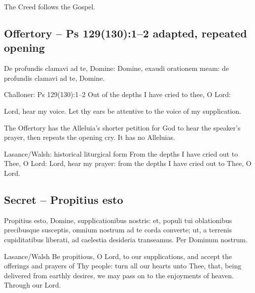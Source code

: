 The Creed follows the Gospel.

\subsection{Offertory -- Ps 129(130):1--2 adapted, repeated opening}
\label{proper-offertory}

\begin{latinproper}
De profundis clamavi ad te, Domine: Domine, exaudi orationem meam:
de profundis clamavi ad te, Domine.
\end{latinproper}

\begin{englishwitness}{Challoner: Ps 129(130):1--2}
Out of the depths I have cried to thee, O Lord:

Lord, hear my voice. Let thy ears be attentive to the voice of my supplication.
\end{englishwitness}

The Offertory has the Alleluia's shorter petition for God to hear the
speaker's prayer, then repeats the opening cry. It has no Alleluias.

\begin{englishwitness}{Lasance/Walsh: historical liturgical form}
From the depths I have cried out to Thee, O Lord: Lord, hear my prayer:
from the depths I have cried out to Thee, O Lord.
\end{englishwitness}

\subsection{Secret -- Propitius esto}
\label{proper-secret}

\begin{latinproper}
Propitius esto, Domine, supplicationibus nostris: et, populi tui
oblationibus precibusque susceptis, omnium nostrum ad te corda converte; ut,
a terrenis cupiditatibus liberati, ad caelestia desideria transeamus.
Per Dominum nostrum.
\end{latinproper}

\begin{englishwitness}{Lasance/Walsh}
Be propitious, O Lord, to our supplications, and accept the offerings and
prayers of Thy people: turn all our hearts unto Thee, that, being delivered
from earthly desires, we may pass on to the enjoyments of heaven.
Through our Lord.
\end{englishwitness}

